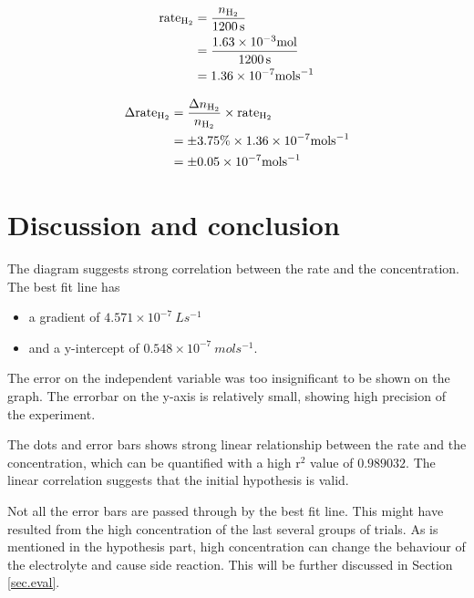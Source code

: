 \documentclass[a4paper]{article}
\begin{document}
\begin{equation}
    \begin{aligned}
        \text{rate}_{\ce{H2}} &= \dfrac{n_{\ce{H2}}}{\SI{1200}{s}}\\
                              &= \dfrac{1.63 \times 10^{-3}\SI{}{mol}}{\SI{1200}{s}}\\
                              &= 1.36 \times 10^{-7}\SI{}{mol s^{-1}}
    \end{aligned}
\end{equation}

\begin{equation}
    \begin{aligned}
        \Delta\text{rate}_{\ce{H2}} &= \dfrac{\Delta n_{\ce{H2}}}{n_{\ce{H2}}} \times \text{rate}_{\ce{H2}}\\
                                    &= \pm3.75\% \times 1.36 \times 10^{-7}\SI{}{mol s^{-1}}\\
                                    &= \pm 0.05 \times 10^{-7}\SI{}{mol s^{-1}}
    \end{aligned}
\end{equation}

\section{Discussion and conclusion}

The diagram suggests strong correlation between the rate and the concentration. The best fit line has 

\begin{itemize}
    \item a gradient of $4.571 \times 10^{-7}\SI{}{L s^{-1}}$
    \item and a y-intercept of $0.548\times 10^{-7} \SI{}{mol s^{-1}}$.
\end{itemize}

The error on the independent variable was too insignificant to be shown on the graph. The errorbar on the y-axis is relatively small, showing high precision of the experiment.

The dots and error bars shows strong linear relationship between the rate and the concentration, which can be quantified with a high r$^2$ value of $0.989032$. The linear correlation suggests that the initial hypothesis is valid.

Not all the error bars are passed through by the best fit line. This might have resulted from the high concentration of the last several groups of trials. As is mentioned in the hypothesis part, high concentration can change the behaviour of the electrolyte and cause side reaction. This will be further discussed in Section \ref{sec.eval}.
\end{document}
